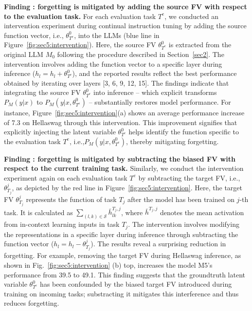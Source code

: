 \textbf{Finding \uppercase\expandafter{}: forgetting is mitigated by adding the source  FV with respect to the evaluation task.}
For each evaluation task $T^e$, we conducted an intervention experiment %
during continual instruction tuning
 by adding the source function vector, i.e., $\theta_{T^e}^0$, into the LLMs (blue line in Figure~\ref{fig:sec5:intervention}). Here, the source FV $\theta_{T^e}^0$ is extracted from the original LLM  $M_0$ following the procedure described in Section~\ref{sec2}. The intervention involves adding the function vector to a specific layer during inference ($h_l=h_l + \theta^0_{T^e}$), and the reported results reflect the best performance obtained by iterating over layers [3, 6, 9, 12, 15]. The findings indicate that integrating the source FV $\theta_{T^e}^0$ into inference -- which explicit transforms $P_M(y|x)$ to  $P_M(y|x,\theta_{T^e}^0)$ -- substantially restores model performance. For instance, Figure~\ref{fig:sec5:intervention}(a) shows an average performance increase of 7.3 on Hellaswag  through this intervention.
This improvement signifies that explicitly injecting the latent variable $\theta^0_{T^e}$ helps identify the function specific to the evaluation task $T^e$, i.e.,\(P_M(y|x,\theta^0_{T^e})\), thereby mitigating forgetting. %


\textbf{Finding \uppercase\expandafter{}: forgetting is mitigated by subtracting the biased FV with respect to the current training task.} 
Similarly, we conduct the intervention experiment again on each evaluation task $T^e$ by subtracting the target FV, i.e., $\theta_{T_j}^j$, as depicted by the red line in Figure~\ref{fig:sec5:intervention}. Here, the target FV $\theta_{T_j}^j$ represents the function of task $T_j$ after the model has been trained on $j$-th task. It is calculated as $\sum_{(l, k)\in \mathcal{S}} \bar{h}_{lk}^{T_j,j}$, where $\bar{h}^{T_j,j}$ denotes the mean activation from in-context learning inputs in task $T_j$. The intervention involves modifying the representations in a specific layer during inference through subtracting the function vector ($h_l=h_l -  \theta_{T_j}^j$). 
The results reveal a surprising  reduction in forgetting. 
For example, removing the target FV during Hellaswag inference, as shown in Fig.~\ref{fig:sec5:intervention} (b) top, increases the model M5's performance from 39.5 to 49.1. This finding suggests that the groundtruth latent variable $\theta_{T^e}^0$ has been confounded by the biased target  FV introduced during training on incoming tasks; substracting it mitigates this interference and thus reduces forgetting.



